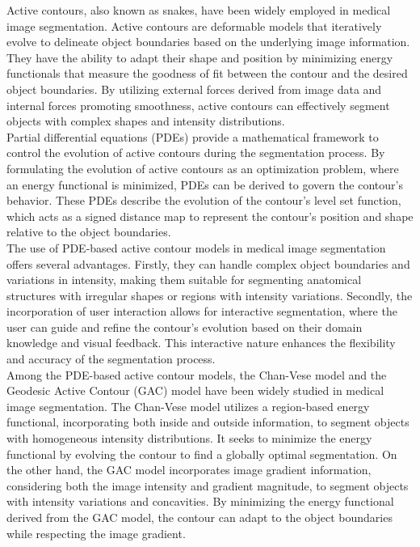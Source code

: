 \documentclass[]{report}
\begin{document}
Active contours, also known as snakes, have been widely employed in medical image segmentation. Active contours are deformable models that iteratively evolve to delineate object boundaries based on the underlying image information. They have the ability to adapt their shape and position by minimizing energy functionals that measure the goodness of fit between the contour and the desired object boundaries. By utilizing external forces derived from image data and internal forces promoting smoothness, active contours can effectively segment objects with complex shapes and intensity distributions.\\

Partial differential equations (PDEs) provide a mathematical framework to control the evolution of active contours during the segmentation process. By formulating the evolution of active contours as an optimization problem, where an energy functional is minimized, PDEs can be derived to govern the contour's behavior. These PDEs describe the evolution of the contour's level set function, which acts as a signed distance map to represent the contour's position and shape relative to the object boundaries.\\

The use of PDE-based active contour models in medical image segmentation offers several advantages. Firstly, they can handle complex object boundaries and variations in intensity, making them suitable for segmenting anatomical structures with irregular shapes or regions with intensity variations. Secondly, the incorporation of user interaction allows for interactive segmentation, where the user can guide and refine the contour's evolution based on their domain knowledge and visual feedback. This interactive nature enhances the flexibility and accuracy of the segmentation process.\\

Among the PDE-based active contour models, the Chan-Vese model and the Geodesic Active Contour (GAC) model have been widely studied in medical image segmentation. The Chan-Vese model utilizes a region-based energy functional, incorporating both inside and outside information, to segment objects with homogeneous intensity distributions. It seeks to minimize the energy functional by evolving the contour to find a globally optimal segmentation. On the other hand, the GAC model incorporates image gradient information, considering both the image intensity and gradient magnitude, to segment objects with intensity variations and concavities. By minimizing the energy functional derived from the GAC model, the contour can adapt to the object boundaries while respecting the image gradient.\\
\end{document}
